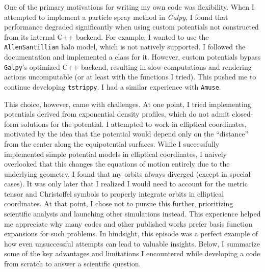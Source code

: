         One of the primary motivations for writing my own code was flexibility. When I attempted to implement a particle spray method in \textit{Galpy}, I found that performance degraded significantly when using custom potentials not constructed from its internal C++ backend. For example, I wanted to use the \texttt{AllenSantillian} halo model, which is not natively supported. I followed the documentation and implemented a class for it. However, custom potentials bypass \texttt{Galpy}'s optimized C++ backend, resulting in slow computations and rendering actions uncomputable (or at least with the functions I tried). This pushed me to continue developing \texttt{tstrippy}. I had a similar experience with \texttt{Amuse}.

        This choice, however, came with challenges. At one point, I tried implementing potentials derived from exponential density profiles, which do not admit closed-form solutions for the potential. I attempted to work in elliptical coordinates, motivated by the idea that the potential would depend only on the ``distance'' from the center along the equipotential surfaces. While I successfully implemented simple potential models in elliptical coordinates, I naively overlooked that this changes the equations of motion entirely due to the underlying geometry. I found that my orbits always diverged (except in special cases). It was only later that I realized I would need to account for the metric tensor and Christoffel symbols to properly integrate orbits in elliptical coordinates. At that point, I chose not to pursue this further, prioritizing scientific analysis and launching other simulations instead. This experience helped me appreciate why many codes and other published works prefer basis function expansions for such problems. In hindsight, this episode was a perfect example of how even unsuccessful attempts can lead to valuable insights. Below, I summarize some of the key advantages and limitations I encountered while developing a code from scratch to answer a scientific question.

